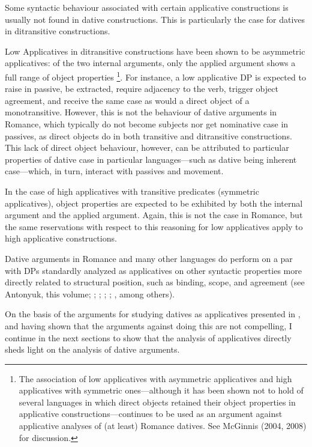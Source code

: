 \documentclass[output=paper,modfonts,nonflat]{langsci/langscibook}
\begin{document}
Some syntactic behaviour associated with certain applicative constructions is usually not found in dative constructions.  This is particularly the case for datives in ditransitive constructions. 

Low Applicatives in ditransitive constructions have been shown to be asymmetric applicatives:  of the two internal arguments, only the applied argument shows a full range of object properties \citep[203]{Pylkkänen2000}\footnote{The association of low applicatives with asymmetric applicatives and high applicatives with symmetric ones—although it has been shown not to hold of several languages in which direct objects retained their object properties in applicative constructions—continues to be used as an argument against applicative analyses of (at least) Romance datives. See McGinnis (2004, 2008) for discussion.}. For instance, a low applicative DP is expected to raise in passive, be extracted, require adjacency to the verb, trigger object agreement, and receive the same case as would a direct object of a monotransitive. However, this is not the behaviour of dative arguments in Romance, which typically do not become subjects nor get nominative case in passives, as direct objects do in both transitive and ditransitive constructions. This lack of direct object behaviour, however, can be attributed to particular properties of dative case in particular languages—such as dative being inherent case—which, in turn, interact with passives and movement.  

In the case of high applicatives with transitive predicates (symmetric applicatives), object properties are expected to be exhibited by both the internal argument and the applied argument. Again, this is not the case in Romance, but the same reservations with respect to this reasoning for low applicatives apply to high applicative constructions. 

Dative arguments in Romance and many other languages do perform on a par with DPs standardly analyzed as applicatives on other syntactic properties more directly related to structural position, such as  binding, scope, and agreement (see Antonyuk, this volume; \citealt{BonehNash2017}; \citealt{Bruening2010}; \citealt{Cuervo2003}; \citealt{Demonte1995}; \citealt{Pineda2016}, among others). 

On the basis of the arguments for studying datives as applicatives presented in , and having shown that the arguments against doing this are not compelling, I continue in the next sections to show that the analysis of applicatives directly sheds light on the analysis of dative arguments.
\end{document}
